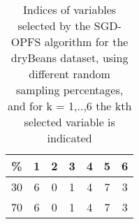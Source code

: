 \begin{table}
	\begin{center}
		\begin{tabular}{c c c c c c c}
			\% & 1 & 2 & 3 & 4 & 5 & 6 \\
			\hline
			30 & 6 & 0 & 1 & 4 & 7 & 3 \\
			70 & 6 & 0 & 1 & 4 & 7 & 3 \\
		\end{tabular}
	\end{center}
	\caption{Indices of variables selected by the SGD-OPFS algorithm for the dryBeans dataset, using different random sampling percentages, and for k = 1,..,6 the kth selected variable is indicated}
\end{table}